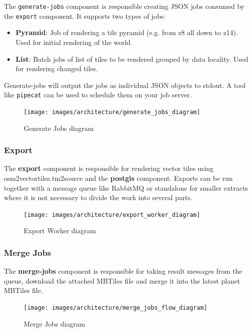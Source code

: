 The \texttt{generate-jobs} component is responsible creating JSON jobs consumed by the \texttt{export} component. It supports two types of jobs:

\begin{itemize}
  \item \textbf{Pyramid}: Job of rendering a tile pyramid (e.g. from z8 all down to z14). Used for initial rendering of the world.
  \item \textbf{List}: Batch jobs of list of tiles to be rendered grouped by data locality. Used for rendering changed tiles.
\end{itemize}

Generate-jobs will output the jobs as individual JSON objects to stdout. A tool like \texttt{pipecat} can be used to schedule them on your job server.

\begin{figure}[H]
  \centering
  \texttt{[image: images/architecture/generate\_jobs\_diagram]}
  \caption{Generate Jobs diagram}
\end{figure}
\clearpage

\subsubsection{Export}

The \textbf{export} component is responsible for rendering vector tiles using osm2vectortiles.tm2source and the \textbf{postgis} component. Exports can be run together with a message queue like RabbitMQ or standalone for smaller extracts where it is not necessary to divide the work into several parts.

\begin{figure}[H]
  \centering
  \texttt{[image: images/architecture/export\_worker\_diagram]}
  \caption{Export Worker diagram}
\end{figure}

\subsubsection{Merge Jobs}

The \textbf{merge-jobs} component is responsible for taking result messages from the queue, download the attached MBTiles file and merge it into the latest planet MBTiles file.

\begin{figure}[H]
  \centering
  \texttt{[image: images/architecture/merge\_jobs\_flow\_diagram]}
  \caption{Merge Jobs diagram}
\end{figure}

